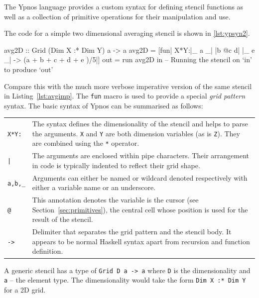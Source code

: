 \documentclass[
    12pt,
    a4paper,
    twoside,
    openright,
    ]{scrbook}
\begin{document}
The Ypnos language provides a custom syntax for defining stencil functions as
well as a collection of primitive operations for their manipulation and use.

The code for a simple two dimensional averaging stencil is shown in
\autoref{lst:ypsyn2}.

\begin{hlisting}[label={lst:ypsyn2},caption={The simple mean function from \autoref{lst:ypsyn1}}]
avg2D :: Grid (Dim X :* Dim Y) a -> a
avg2D = [fun| X*Y:|_  a _|
                  |b @c d|
                  |_  e _| -> (a + b + c + d + e )/5|]
out = run avg2D in -- Running the stencil on `in' to produce `out'
\end{hlisting}

Compare this with the much more verbose imperative version of the same stencil
in Listing~\ref{lst:avgimp}.  The \texttt{fun} macro is used to provide a
special \emph{grid pattern} syntax. The basic syntax of Ypnos can be summarised
as follows:

\begin{tabular}{p{} p{}}

\texttt{X*Y:} & The syntax defines the dimensionality of the stencil and helps
to parse the arguments. \texttt{X} and \texttt{Y} are both dimension variables
(as is \texttt{Z}). They are combined using the \texttt{*} operator.  \\

\texttt{|} & The arguments are enclosed within pipe characters.  Their
arrangement in code is typically indented to reflect their grid shape.  \\

\texttt{a,b,\_} & Arguments can either be named or wildcard denoted
respectively with either a variable name or an underscore.  \\

\texttt{@} & This annotation denotes the variable is the cursor
(see Section~\ref{sec:primitives}), the central cell whose position is used for the
result of the stencil.  \\

\texttt{->} & Delimiter that separates the grid pattern and the stencil body. It
appears to be normal Haskell syntax apart from recursion and function
definition.
\\

\end{tabular}

A generic stencil has a type of \texttt{Grid D a -> a} where \texttt{D} is the
dimensionality and \texttt{a} -- the element type. The dimensionality would take
the form \texttt{Dim X :* Dim Y} for a 2D grid.
\end{document}
